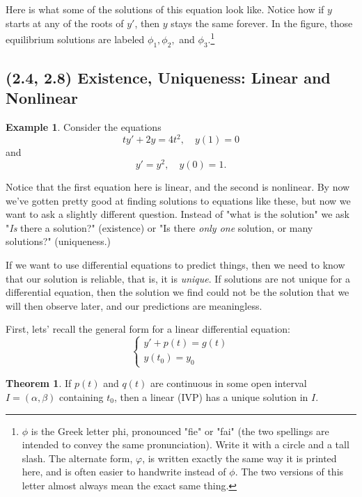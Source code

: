 \documentclass[a5paper]{article}
\theoremstyle{definition}%
\newtheorem*{theorem*}{Theorem} %
\newtheorem*{example*}{Example}
\numberwithin{exercise}{section}
\theoremstyle{remark}%
\begin{document}
\begin{enumerate}[label=\Alph*:]
\pagebreak
Here is what some of the solutions of this equation look like. Notice how if $y$ starts at any of the roots of $y'$, then $y$ stays the same forever. 
In the figure, those equilibrium solutions are labeled $\phi_1, \phi_2,$ and $\phi_3.$\footnote{$\phi$ is the Greek letter phi, pronounced "fie" or "fai" (the two spellings are intended to convey the same pronunciation). Write it with a circle and a tall slash. The alternate form, $\varphi$, is written exactly the same way it is printed here, and is often easier to handwrite instead of $\phi$. The two versions of this letter almost always mean the exact same thing.}


\end{enumerate}


\subsection{(2.4, 2.8) Existence, Uniqueness: Linear and Nonlinear}

\begin{example*}
Consider the equations
$$ty'+2y=4t^2, \quad	y(1)=0$$
and 
$$y'=y^2, \quad	y(0)=1.$$
\end{example*}
Notice that the first equation here is linear, and the second is nonlinear. By now we've gotten pretty good at finding solutions to equations like these, but now we want to ask a slightly different question. Instead of "what is the solution" we ask "\emph{Is} there a solution?" (existence) or "Is there \emph{only one }solution, or many solutions?" (uniqueness.)

If we want to use differential equations to predict things, then we need to know that our solution is reliable, that is, it is \emph{unique}. If solutions are not unique for a differential equation, then the solution we find could not be the solution that we will then observe later, and our predictions are meaningless. 

\pagebreak
First, lets' recall the general form for a linear differential equation: 
$$\begin{cases}
y' + p(t)=g(t)\\
y(t_0)=y_0
\end{cases}$$

\begin{highlight}
\begin{theorem*}
If $p(t)$ and $q(t)$ are continuous in some open interval $I = (\alpha, \beta)$ containing $t_0$, then a linear (IVP) has a unique solution in $I$. 
\end{theorem*}
\end{highlight}
\end{document}
